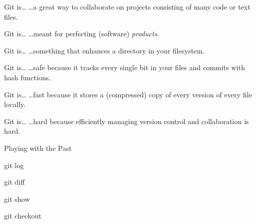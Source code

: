 
\begin{frame}{Git is\ldots}
  \hangindent=30pt \Huge {
  \ldots a great way to collaborate on projects consisting of
    many code or text files.
  }
\end{frame}

\begin{frame}{Git is\ldots}
  \hangindent=30pt \Huge {
  \ldots meant for perfecting (software) \emph{products}.
  }
\end{frame}

\begin{frame}{Git is\ldots}
  \hangindent=30pt \Huge {
  \ldots something that enhances a directory in your filesystem.
  }
\end{frame}


\begin{frame}{Git is\ldots}
  \hangindent=30pt \Huge {
  \ldots safe because it tracks every single bit in your files and commits with
  hash functions.
  }
\end{frame}

\begin{frame}{Git is\ldots}
  \hangindent=30pt \Huge {
  \ldots fast because it stores a (compressed) copy of every version
  of every file locally.
  }
\end{frame}

\begin{frame}{Git is\ldots}
  \hangindent=30pt \Huge {
  \ldots hard because efficiently managing version control and collaboration is
  hard.
  }
\end{frame}

\begin{frame}[fragile]{Playing with the Past}
  \begin{gitCommand}git log\end{gitCommand}
  \begin{gitCommand}git diff\end{gitCommand}
  \begin{gitCommand}git show\end{gitCommand}
  \begin{gitCommand}git checkout\end{gitCommand}
\end{frame}

